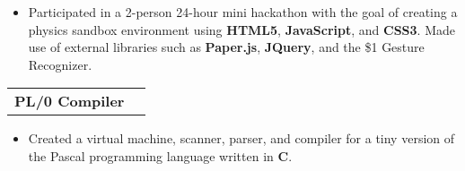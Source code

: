 \documentclass[margin]{res}
\begin{document}
\begin{resume}
\begin{itemize}
				\item[] Participated in a 2-person 24-hour mini hackathon with the goal
						of creating a physics sandbox environment using {\bf HTML5},
						{\bf JavaScript}, and {\bf CSS3}. Made use of external
						libraries such as {\bf Paper.js}, {\bf JQuery}, and the
						\$1 Gesture Recognizer.
			\end{itemize}
			\begin{tabular}{p{3in} r}
				{\bf PL/0 Compiler}
			\end{tabular}
			\begin{itemize}
				\item[] Created a virtual machine, scanner, parser, and compiler for
						a tiny version of the Pascal programming language written in {\bf C}.
			\end{itemize}

\end{resume}
\end{document}

